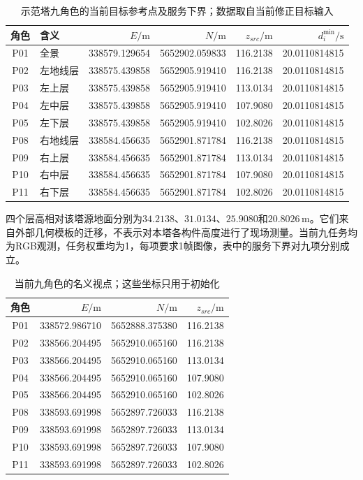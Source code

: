 \begin{table}[htbp]
\centering\small
\caption{示范塔九角色的当前目标参考点及服务下界；数据取自当前修正目标输入}
\label{s0602:current_centers}
\begin{tabular}{@{}clrrrr@{}}
\toprule
角色 & 含义 & $E/\mathrm m$ & $N/\mathrm m$ & $z_{src}/\mathrm m$ & $d_i^{\min}/\mathrm s$\\
\midrule
P01 & 全景 & 338579.129654 & 5652902.059833 & 116.2138 & 20.0110814815\\
P02 & 左地线层 & 338575.439858 & 5652905.919410 & 116.2138 & 20.0110814815\\
P03 & 左上层 & 338575.439858 & 5652905.919410 & 113.0134 & 20.0110814815\\
P04 & 左中层 & 338575.439858 & 5652905.919410 & 107.9080 & 20.0110814815\\
P05 & 左下层 & 338575.439858 & 5652905.919410 & 102.8026 & 20.0110814815\\
P08 & 右地线层 & 338584.456635 & 5652901.871784 & 116.2138 & 20.0110814815\\
P09 & 右上层 & 338584.456635 & 5652901.871784 & 113.0134 & 20.0110814815\\
P10 & 右中层 & 338584.456635 & 5652901.871784 & 107.9080 & 20.0110814815\\
P11 & 右下层 & 338584.456635 & 5652901.871784 & 102.8026 & 20.0110814815\\
\bottomrule
\end{tabular}
\end{table}

四个层高相对该塔源地面分别为$34.2138$、$31.0134$、$25.9080$和$20.8026\,\mathrm m$。它们来自外部几何模板的迁移，不表示对本塔各构件高度进行了现场测量\cite{KPLC2025}。当前九任务均为RGB观测，任务权重均为1，每项要求1帧图像，表中的服务下界对九项分别成立。

\begin{table}[htbp]
\centering\small
\caption{当前九角色的名义视点；这些坐标只用于初始化}
\label{s0602:initial_viewpoints}
\begin{tabular}{@{}crrr@{}}
\toprule
角色 & $E/\mathrm m$ & $N/\mathrm m$ & $z_{src}/\mathrm m$\\
\midrule
P01 & 338572.986710 & 5652888.375380 & 116.2138\\
P02 & 338566.204495 & 5652910.065160 & 116.2138\\
P03 & 338566.204495 & 5652910.065160 & 113.0134\\
P04 & 338566.204495 & 5652910.065160 & 107.9080\\
P05 & 338566.204495 & 5652910.065160 & 102.8026\\
P08 & 338593.691998 & 5652897.726033 & 116.2138\\
P09 & 338593.691998 & 5652897.726033 & 113.0134\\
P10 & 338593.691998 & 5652897.726033 & 107.9080\\
P11 & 338593.691998 & 5652897.726033 & 102.8026\\
\bottomrule
\end{tabular}
\end{table}

